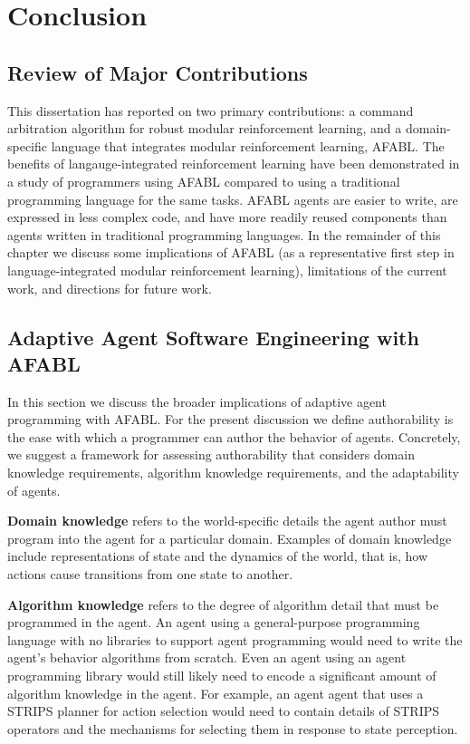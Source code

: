 \chapter{Conclusion}\label{ch:conclusion}

\section{Review of Major Contributions}

This dissertation has reported on two primary contributions: a command arbitration algorithm for robust modular reinforcement learning, and a domain-specific language that integrates modular reinforcement learning, AFABL. The benefits of langauge-integrated reinforcement learning have been demonstrated in a study of programmers using AFABL compared to using a traditional programming language for the same tasks. AFABL agents are easier to write, are expressed in less complex code, and have more readily reused components than agents written in traditional programming languages. In the remainder of this chapter we discuss some implications of AFABL (as a representative first step in language-integrated modular reinforcement learning), limitations of the current work, and directions for future work.

\section{Adaptive Agent Software Engineering with AFABL}

In this section we discuss the broader implications of adaptive agent programming with AFABL. For the present discussion we define authorability is the ease with which a programmer can author the behavior of agents.  Concretely, we suggest a framework for assessing authorability that considers domain knowledge requirements, algorithm knowledge requirements, and the adaptability of agents.

{\bf Domain knowledge} refers to the world-specific details the agent author must program into the agent for a particular domain.  Examples of domain knowledge include representations of state and the dynamics of the world, that is, how actions cause transitions from one state to another.

{\bf Algorithm knowledge} refers to the degree of algorithm detail that must be programmed in the agent.  An agent using a general-purpose programming language with no libraries to support agent programming would need to write the agent's behavior algorithms from scratch. Even an agent using an agent programming library would still likely need to encode a significant amount of algorithm knowledge in the agent. For example, an agent agent that uses a STRIPS planner for action selection would need to contain details of STRIPS operators and the mechanisms for selecting them in response to state perception.

